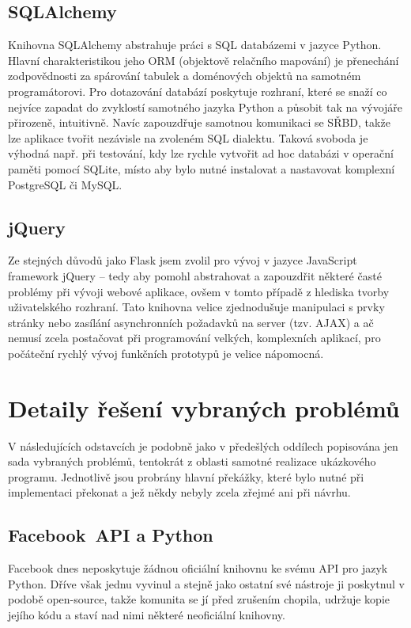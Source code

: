 \documentclass[12pt,oneside,final]{fithesis2}
\begin{document}
\subsection{SQLAlchemy}
Knihovna SQLAlchemy abstrahuje práci s SQL databázemi v jazyce Python. Hlavní charakteristikou jeho ORM (objektově relačního mapování) je přenechání zodpovědnosti za spárování tabulek a doménových objektů na samotném programátorovi. Pro dotazování databází poskytuje rozhraní, které se snaží co nejvíce zapadat do zvyklostí samotného jazyka Python a působit tak na vývojáře přirozeně, intuitivně. Navíc zapouzdřuje samotnou komunikaci se SŘBD, takže lze aplikace tvořit nezávisle na zvoleném SQL dialektu. Taková svoboda je výhodná např. při testování, kdy lze rychle vytvořit ad hoc databázi v operační paměti pomocí SQLite, místo aby bylo nutné instalovat a nastavovat komplexní PostgreSQL či MySQL.

\subsection{jQuery}
Ze stejných důvodů jako Flask jsem zvolil pro vývoj v jazyce JavaScript framework jQuery -- tedy aby pomohl abstrahovat a zapouzdřit některé časté problémy při vývoji webové aplikace, ovšem v tomto případě z hlediska tvorby uživatelského rozhraní. Tato knihovna velice zjednodušuje manipulaci s prvky stránky nebo zasílání asynchronních požadavků na server (tzv. AJAX) a ač nemusí zcela postačovat při programování velkých, komplexních aplikací, pro počáteční rychlý vývoj funkčních prototypů je velice nápomocná.


\section{Detaily řešení vybraných problémů}
V následujících odstavcích je podobně jako v předešlých oddílech popisována jen sada vybraných problémů, tentokrát z oblasti samotné realizace ukázkového programu. Jednotlivě jsou probrány hlavní překážky, které bylo nutné při implementaci překonat a jež někdy nebyly zcela zřejmé ani při návrhu.

\subsection{Facebook~API a Python}
Facebook dnes neposkytuje žádnou oficiální knihovnu ke svému API pro jazyk Python. Dříve však jednu vyvinul a stejně jako ostatní své nástroje ji poskytnul v podobě open-source, takže komunita se jí před zrušením chopila, udržuje kopie jejího kódu a staví nad nimi některé neoficiální knihovny.
\end{document}

